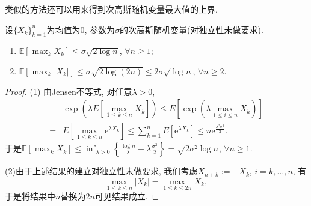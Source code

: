 类似的方法还可以用来得到次高斯随机变量最大值的上界. 
\begin{theorem}[次高斯随机变量最大值的上界]\label{thm:UpperBdForMaximaOfSGRV}
	设$\{X_k\}_{k=1}^n$为均值为$0$, 参数为$\sigma$的次高斯随机变量(对独立性未做要求). 
	\begin{enumerate}[label=(\arabic*)]
		\item $\mathbb{E} \left[ \max_k X_k \right] \leq \sigma \sqrt{2 \log n}$, $\forall n \geq 1$; 
		\item $\mathbb{E} \left[ \max_k \left| X_k \right| \right] \leq \sigma \sqrt{2 \log (2n)} \leq 2 \sigma \sqrt{\log n}$, $\forall n \geq 2$. 
	\end{enumerate}
\end{theorem}
\begin{proof}
(1) 由Jensen不等式, 对任意$\lambda > 0$, 
		\begin{align*}
			& \exp \left(\lambda E \left[ \max_{1 \leq k \leq n} X_k \right] \right)
			\leq E \left[ \exp \left( \lambda \max_{1 \leq i \leq n} X_k \right) \right] \\ 
			= & E \left[ \max_{1 \leq k \leq n} \mathrm{e}^{\lambda X_k} \right]
			\leq \sum_{k=1}^n  E \left[ \mathrm{e}^{\lambda X_k} \right]
			\leq n \mathrm{e}^{\frac{\lambda^2 \sigma^2}{2}}. 
		\end{align*}
		于是$\mathbb{E} \left[ \max_k X_k \right] \leq \inf_{\lambda > 0} \left\{ \frac{\log n}{\lambda} + \lambda \frac{\sigma^2}{2} \right\} = \sqrt{2 \sigma^2 \log n}$, $\forall n \geq 1$. 

(2)由于上述结果的建立对独立性未做要求, 我们考虑$X_{n+k} := - X_k$, $i = k, \dots, n$, 有
		\begin{equation*}
			\max_{1 \leq k \leq n} |X_k| = \max_{1 \leq k \leq 2n} X_k, 
		\end{equation*}
		于是将结果中$n$替换为$2n$可见结果成立. 
\end{proof}

